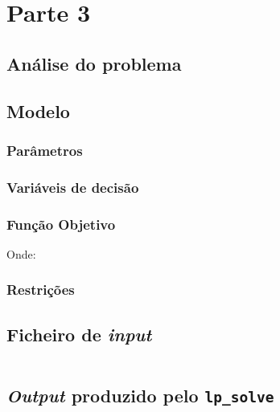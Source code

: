 \chapter{Parte 3}
\label{cap:p3}

\section{Análise do problema}



\section{Modelo}

\subsection{Parâmetros}


\subsection{Variáveis de decisão}
\label{p3:vardec}


\subsection{Função Objetivo}


Onde:



\subsection{Restrições}



\section{Ficheiro de \emph{input}}


\begin{verbatim}

\end{verbatim}

\section{\emph{Output} produzido pelo \texttt{lp\_solve}}


\begin{verbatim}

\end{verbatim}

